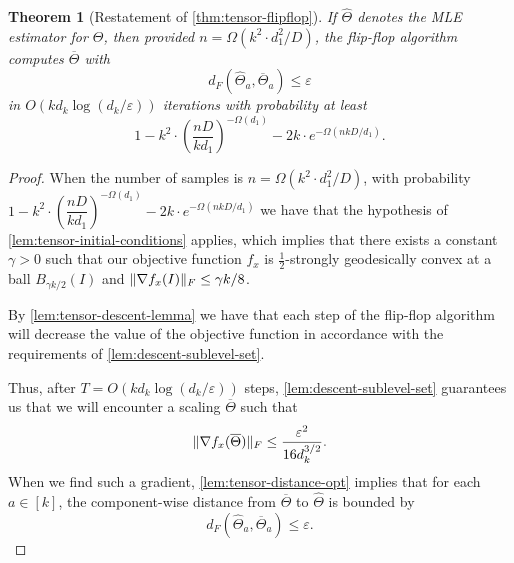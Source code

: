 \documentclass[aos]{imsart}
\newtheorem{theorem}{Theorem}
\theoremstyle{definition}
\DeclarePairedDelimiter{\norm}{\lVert}{\rVert}
\newcommand{\otheta}{\overline{\Theta}}
\newcommand{\htheta}{\widehat{\Theta}}
\newcommand{\eps}{\varepsilon}
\begin{document}
\begin{theorem}[Restatement of \cref{thm:tensor-flipflop}]
	If $\htheta$ denotes the MLE estimator for $\Theta$, then provided $n = \Omega(k^2 \cdot d_1^2/D)$, the flip-flop algorithm computes $\otheta$ with
	$$ d_F(\htheta_a, \otheta_a) \leq \eps $$
	in $O(k d_k \log(d_k/\eps))$ iterations with probability at least
	$$ 1 - k^2 \cdot \left( \dfrac{nD}{k d_1} \right)^{-\Omega(d_1)} - 2k \cdot e^{- \Omega(nkD/d_1)}.$$
\end{theorem}

\begin{proof}
	When the number of samples is $n = \Omega(k^2 \cdot d_1^2/D)$, with probability \\
	$ 1 - k^2 \cdot \left( \dfrac{nD}{k d_1} \right)^{-\Omega(d_1)} - 2k \cdot e^{- \Omega(nkD/d_1)}$ we have that the hypothesis of \cref{lem:tensor-initial-conditions} applies, which implies that there exists a constant $\gamma > 0$ such that our objective function $f_x$ is $\frac{1}{2}$-strongly geodesically convex at a ball $B_{\gamma k/2}(I)$ and $\norm{\nabla f_x(I)}_F \leq \gamma k /8$.

	By \cref{lem:tensor-descent-lemma} we have that each step of the flip-flop algorithm will decrease the value of the objective function in accordance with the requirements of \cref{lem:descent-sublevel-set}.

	Thus, after $T = O( k d_k \log(d_k/\eps) )$ steps, \cref{lem:descent-sublevel-set} guarantees us that we will encounter a scaling $\otheta$ such that
	$$ \norm{\nabla f_x(\otheta)}_F \leq \dfrac{\eps^2}{16 d_k^{3/2}}.$$
	When we find such a gradient, \cref{lem:tensor-distance-opt} implies that for each $a \in [k]$, the component-wise distance from $\otheta$ to $\htheta$ is bounded by
	$$ d_F(\htheta_a, \otheta_a) \leq \eps. $$
\end{proof}

\end{document}

